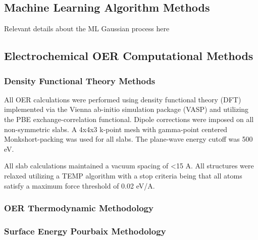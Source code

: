 
\subsection{Machine Learning Algorithm Methods}

Relevant details about the ML Gaussian process here %

\subsection{Electrochemical OER Computational Methods}

\subsubsection{Density Functional Theory Methods}
All OER calculations were performed using density functional theory (DFT) implemented via the Vienna ab-initio simulation package (VASP) and utilizing the PBE exchange-correlation functional.
Dipole corrections were imposed on all non-symmetric slabs.
A 4x4x3 k-point mesh with gamma-point centered Monkshort-packing was used for all slabs.
The plane-wave energy cutoff was 500 eV.


All slab calculations maintained a vacuum spacing of <15 A.
All structures were relaxed utilizing a TEMP algorithm with a stop criteria being that all atoms satisfy a maximum force threshold of 0.02 eV/A.

\subsubsection{OER Thermodynamic Methodology}

\subsubsection{Surface Energy Pourbaix Methodology}

